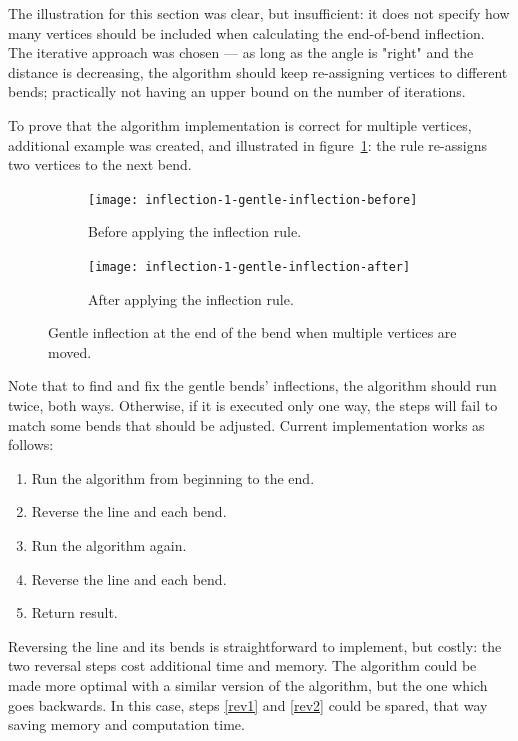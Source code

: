 \documentclass[a4paper]{article}
\begin{document}
The illustration for this section was clear, but insufficient: it does not
specify how many vertices should be included when calculating the end-of-bend
inflection. The iterative approach was chosen --- as long as the angle is "right"
and the distance is decreasing, the algorithm should keep re-assigning vertices
to different bends; practically not having an upper bound on the number of
iterations.

To prove that the algorithm implementation is correct for multiple vertices,
additional example was created, and illustrated in
figure~\ref{fig:inflection-1-gentle-inflection}: the rule re-assigns two
vertices to the next bend.

\begin{figure}[h]
    \centering
    \begin{subfigure}[b]{.49\textwidth}
        \texttt{[image: inflection-1-gentle-inflection-before]}
        \caption{Before applying the inflection rule.}
    \end{subfigure}
    \hfill
    \begin{subfigure}[b]{.49\textwidth}
        \texttt{[image: inflection-1-gentle-inflection-after]}
        \caption{After applying the inflection rule.}
    \end{subfigure}
    \caption{Gentle inflection at the end of the bend when multiple vertices
    are moved.}
    \label{fig:inflection-1-gentle-inflection}
\end{figure}

Note that to find and fix the gentle bends' inflections, the algorithm should
run twice, both ways. Otherwise, if it is executed only one way, the steps will
fail to match some bends that should be adjusted. Current implementation works
as follows:

\begin{enumerate}
    \item Run the algorithm from beginning to the end.
    \item \label{rev1} Reverse the line and each bend.
    \item Run the algorithm again.
    \item \label{rev2} Reverse the line and each bend.
    \item Return result.
\end{enumerate}

Reversing the line and its bends is straightforward to implement, but costly:
the two reversal steps cost additional time and memory. The algorithm could be
made more optimal with a similar version of the algorithm, but the one which
goes backwards. In this case, steps \ref{rev1} and \ref{rev2} could be spared,
that way saving memory and computation time.
\end{document}
